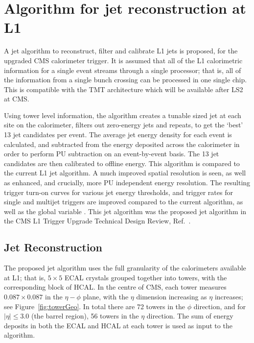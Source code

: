 \section{Algorithm for jet reconstruction at L1}
\label{Sec:Algo}
A jet algorithm to reconstruct, filter and calibrate \ac{L1} jets is proposed, for the upgraded \ac{CMS} calorimeter trigger.
It is assumed that all of the \ac{L1} calorimetric information for a single event streams through a single processor; that is, all of the information from a single bunch crossing can be processed in one single chip.
This is compatible with the \ac{TMT} architecture which will be available after LS2 at \ac{CMS}. 

Using tower level information, the algorithm creates a tunable sized jet at each site on the calorimeter, filters out zero-energy jets and repeats, to get the `best' 13 jet candidates per event. The average jet energy density for each event is calculated, and subtracted from the energy deposited across the calorimeter in order to perform \ac{PU} subtraction on an event-by-event basis. 
The 13 jet candidates are then calibrated to offline energy. 
This algorithm is compared to the current L1 jet algorithm.%
A much improved spatial resolution is seen, as well as enhanced, and crucially, more \ac{PU} independent energy resolution. 
The resulting trigger turn-on curves for various jet energy thresholds, and trigger rates for single and multijet triggers are improved compared to the current algorithm, as well as the global variable \HT.
This jet algorithm was the proposed jet algorithm in the \ac{CMS} \ac{L1} Trigger Upgrade Technical Design Review, Ref.~\cite{Tapper:1556311}.


\subsection{Jet Reconstruction}

The proposed jet algorithm uses the full granularity of the calorimeters available at \ac{L1}; that is, $5 \times 5$ \ac{ECAL} crystals grouped together into towers, with the corresponding block of \ac{HCAL}. 
In the centre of \ac{CMS}, each tower measures $0.087\times0.087$ in the $\eta-\phi$ plane, with the $\eta$ dimension increasing as $\eta$ increases; see Figure~\ref{fig:towerGeo}. 
In total there are 72 towers in the $\phi$ direction, and for $|\eta|\leq3.0$ (the barrel region), 56 towers in the $\eta$ direction.
The sum of energy deposits in both the \ac{ECAL} and \ac{HCAL} at each tower is used as input to the algorithm. 

